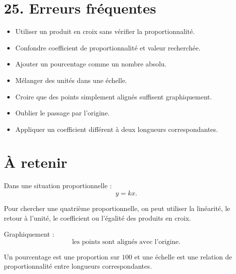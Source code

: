 \section{25. Erreurs fréquentes}

\begin{itemize}
\item Utiliser un produit en croix sans vérifier la proportionnalité.
\item Confondre coefficient de proportionnalité et valeur recherchée.
\item Ajouter un pourcentage comme un nombre absolu.
\item Mélanger des unités dans une échelle.
\item Croire que des points simplement alignés suffisent graphiquement.
\item Oublier le passage par l'origine.
\item Appliquer un coefficient différent à deux longueurs correspondantes.
\end{itemize}

\section{À retenir}

\begin{aretenir}
Dans une situation proportionnelle :
\[
\boxed{y=kx}.
\]

Pour chercher une quatrième proportionnelle, on peut utiliser la linéarité, le retour à l'unité, le coefficient ou l'égalité des produits en croix.

Graphiquement :
\[
\boxed{\text{les points sont alignés avec l'origine}}.
\]

Un pourcentage est une proportion sur $100$ et une échelle est une relation de proportionnalité entre longueurs correspondantes.
\end{aretenir}
